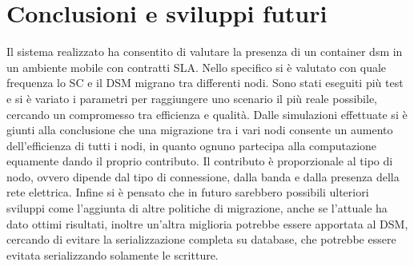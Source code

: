 \chapter{Conclusioni e sviluppi futuri}\label{conclusioni}
Il sistema realizzato ha consentito di valutare la presenza di un container dsm in un ambiente mobile con contratti SLA. Nello specifico si è valutato con quale frequenza lo SC e il DSM migrano tra differenti nodi. Sono stati eseguiti più test e si è variato i parametri per raggiungere uno scenario il più reale possibile, cercando un compromesso tra efficienza e qualità. Dalle simulazioni effettuate si è giunti alla conclusione che una migrazione tra i vari nodi consente un aumento dell'efficienza di tutti i nodi, in quanto ognuno partecipa alla computazione equamente dando il proprio contributo. Il contributo è proporzionale al tipo di nodo, ovvero dipende dal tipo di connessione, dalla banda e dalla presenza della rete elettrica. Infine si è pensato che in futuro sarebbero possibili ulteriori sviluppi come l'aggiunta di altre politiche di migrazione, anche se l'attuale ha dato ottimi risultati, inoltre un'altra miglioria potrebbe essere apportata al DSM, cercando di evitare la serializzazione completa su database, che potrebbe essere evitata serializzando solamente le scritture.